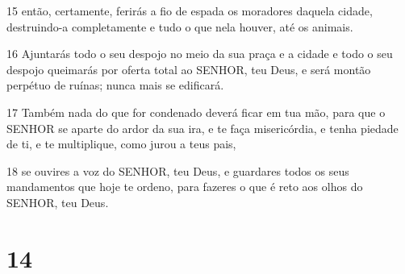 \par 15 então, certamente, ferirás a fio de espada os moradores daquela cidade, destruindo-a completamente e tudo o que nela houver, até os animais.
\par 16 Ajuntarás todo o seu despojo no meio da sua praça e a cidade e todo o seu despojo queimarás por oferta total ao SENHOR, teu Deus, e será montão perpétuo de ruínas; nunca mais se edificará.
\par 17 Também nada do que for condenado deverá ficar em tua mão, para que o SENHOR se aparte do ardor da sua ira, e te faça misericórdia, e tenha piedade de ti, e te multiplique, como jurou a teus pais,
\par 18 se ouvires a voz do SENHOR, teu Deus, e guardares todos os seus mandamentos que hoje te ordeno, para fazeres o que é reto aos olhos do SENHOR, teu Deus.

\chapter{14}


